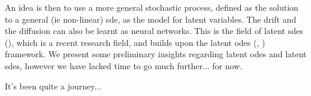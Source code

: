An idea is then to use a more general stochastic process, defined as the solution to a general (ie non-linear) \gls{sde}, as the model for 
latent variables. The drift and the diffusion can also be learnt as neural networks. This is the field of \glspl{latent sde} (\cite{peluchetti_infinitely_2020}), 
which is a recent research field, and builds upon the \glspl{latent ode} (\cite{chen_neural_2019}, \cite{rubanova_latent_2019}) framework. 
We present some preliminary insights regarding \glspl{latent ode} and \glspl{latent sde}, however we have lacked time to go much further... for now.

It's been quite a journey...